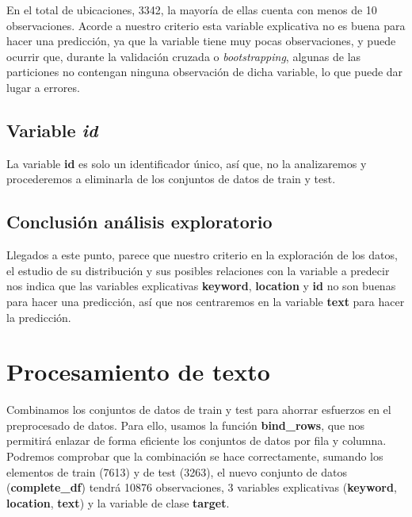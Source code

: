 \documentclass[]{article}
\newenvironment{Shaded}{\begin{snugshade}}{\end{snugshade}}
\newcommand{\NormalTok}[1]{#1}
\newcommand{\OperatorTok}[1]{\textcolor[rgb]{0.81,0.36,0.00}{\textbf{#1}}}
\newcommand{\OtherTok}[1]{\textcolor[rgb]{0.56,0.35,0.01}{#1}}
\newcommand{\StringTok}[1]{\textcolor[rgb]{0.31,0.60,0.02}{#1}}
\begin{document}
En el total de ubicaciones, 3342, la mayoría de ellas cuenta con menos
de 10 observaciones. Acorde a nuestro criterio esta variable explicativa
no es buena para hacer una predicción, ya que la variable tiene muy
pocas observaciones, y puede ocurrir que, durante la validación cruzada
o \emph{bootstrapping}, algunas de las particiones no contengan ninguna
observación de dicha variable, lo que puede dar lugar a errores.

\hypertarget{variable-id}{%
\subsection{\texorpdfstring{Variable
\emph{id}}{Variable id}}\label{variable-id}}

La variable \textbf{id} es solo un identificador único, así que, no la
analizaremos y procederemos a eliminarla de los conjuntos de datos de
train y test.

\begin{Shaded}
\end{Shaded}

\hypertarget{conclusiuxf3n-anuxe1lisis-exploratorio}{%
\subsection{Conclusión análisis
exploratorio}\label{conclusiuxf3n-anuxe1lisis-exploratorio}}

Llegados a este punto, parece que nuestro criterio en la exploración de
los datos, el estudio de su distribución y sus posibles relaciones con
la variable a predecir nos indica que las variables explicativas
\textbf{keyword}, \textbf{location} y \textbf{id} no son buenas para
hacer una predicción, así que nos centraremos en la variable
\textbf{text} para hacer la predicción.

\hypertarget{procesamiento-de-texto}{%
\section{Procesamiento de texto}\label{procesamiento-de-texto}}

Combinamos los conjuntos de datos de train y test para ahorrar esfuerzos
en el preprocesado de datos. Para ello, usamos la función
\textbf{bind\_rows}, que nos permitirá enlazar de forma eficiente los
conjuntos de datos por fila y columna. Podremos comprobar que la
combinación se hace correctamente, sumando los elementos de train (7613)
y de test (3263), el nuevo conjunto de datos (\textbf{complete\_df})
tendrá 10876 observaciones, 3 variables explicativas (\textbf{keyword},
\textbf{location}, \textbf{text}) y la variable de clase
\textbf{target}.
\end{document}
